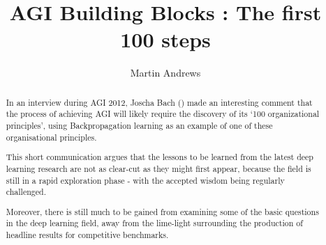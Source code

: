 \documentclass[citeauthoryear]{llncs}
\begin{document}
%
\frontmatter          %
%
\pagestyle{headings}  %
%
\mainmatter              %
%
\title{AGI Building Blocks : The first 100 steps}
%
%
\author{Martin Andrews}
%
%
%

\maketitle              %

\begin{abstract}



In an interview  during AGI 2012, Joscha Bach (\cite{Joscha-Bach-2012-interview}) 
made an interesting comment that the process of achieving 
AGI will likely require the discovery of its `100 organizational principles', 
using Backpropagation learning as an example of one of these organisational principles.  

This short communication argues that the lessons to be learned from 
the latest deep learning research are not as clear-cut as they might first appear,
because the field is still in a rapid exploration phase - with the accepted wisdom 
being regularly challenged.

Moreover, there is still much to be gained from examining some of the 
basic questions in the deep learning field, away from the lime-light 
surrounding the production of headline results for competitive benchmarks.

\end{abstract}
%
\end{document}
